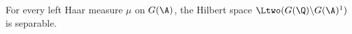 For every left Haar measure $\mu$ on $G(\A)$, the Hilbert space $\Ltwo(G(\Q)\backslash G(\A)^1)$ is separable.
